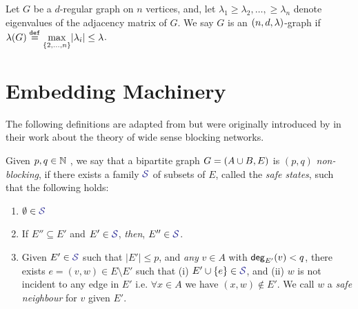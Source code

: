 \documentclass[11pt]{article}
\begin{document}
\begin{definition}\label{def:expander-graphs}
Let $G$ be a $d$-regular graph on $n$ vertices, and, let $\lambda_1 \geq \lambda_2, \dots, \geq \lambda_n$ denote eigenvalues of the adjacency matrix of $G$.
We say $G$ is an $(n, d, \lambda)$-graph if $\lambda(G) \text{}\overset{\mathtt{def}}{=} \underset{{\{2, \dots, n\}}}{\max}|\lambda_i| \leq \lambda$.
\end{definition}


\begin{lemma}\label{lemma:expanders-mixing-lemma}
	
\end{lemma}


\section{Embedding Machinery}
\label{sec:embed-machinery}
The following definitions are adapted from \citep{nenadov2023routing} but were originally introduced by \citet{feldman1988wide} in their work about the theory of wide sense blocking networks.

\begin{definition}
Given $p,q \in \mathbb{N}$ , we say that a bipartite graph $G = (A \cup B, E)$ is $(p, q)$ \emph{non-blocking}, if there exists a family $\Family{S}$ of subsets of $E$, called the \emph{safe states}, such that the following holds:

\begin{enumerate}
	\item $\emptyset \in \Family{S}$
	\item If $E'' \subseteq E'$ and $E' \in \Family{S}$, \emph{then}, $E'' \in \Family{S}$.
	\item Given $E' \in \Family{S}$ such that $|E'| \leq p$, and \emph{any} $v \in A$ with $\mathsf{deg}_{E'}(v) < q$, there exists $e = (v, w) \in E \setminus E'$  such that (i) $E' \cup \Set{e} \in \SafeStates $, and (ii) $w$ is not incident to any edge in $E'$ i.e. $\forall x \in A$ we have $(x,w) \notin E'$. 
 We call $w$ a \emph{safe neighbour} for $v$ given $E'$.
\end{enumerate}

\end{definition}
\end{document}
